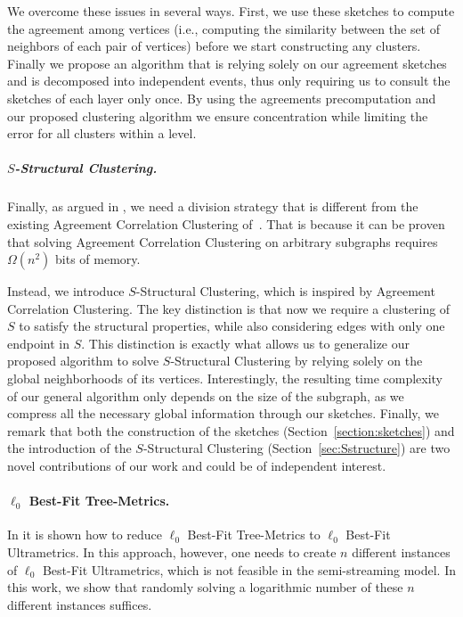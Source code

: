 \documentclass{article}
\begin{document}
We overcome these issues in several ways. 
First, we use these sketches to compute the agreement among vertices (i.e., computing the similarity between the set of neighbors of each pair of vertices) before we start constructing any clusters.
Finally we propose an algorithm that is relying solely on our agreement sketches and is decomposed into independent events, thus only requiring us to consult the sketches of each layer only once. By using the agreements precomputation and our proposed clustering algorithm we ensure concentration while limiting the error for all clusters within a level.


\subparagraph*{$S$-Structural Clustering.} Finally, as argued in , we need a division strategy that is different from the existing Agreement Correlation Clustering of~\cite{cohen2022fitting}.
That is because it can be proven that solving Agreement Correlation Clustering on arbitrary subgraphs requires $\Omega(n^2)$ bits of memory.

Instead, we introduce $S$-Structural Clustering, which is inspired by Agreement Correlation Clustering. The key distinction is that now we require a clustering of $S$ to satisfy the structural properties, while also considering edges with only one endpoint in $S$.
This distinction is exactly what allows us to generalize our proposed algorithm to solve $S$-Structural Clustering by relying solely on the global neighborhoods of its vertices. 
Interestingly, the resulting time complexity of our general algorithm only depends on the size of the subgraph, as we compress all the necessary global information through our sketches.
Finally, we remark that both the construction of the sketches (Section~\ref{section:sketches}) and the introduction of the \( S \)-Structural Clustering (Section~\ref{sec:Sstructure}) are two novel contributions of our work and could be of independent interest. 


\paragraph*{$\ell_0$ Best-Fit Tree-Metrics.}
In \cite{kipouridis2023fitting} it is shown how to reduce $\ell_0$ Best-Fit Tree-Metrics to $\ell_0$ Best-Fit Ultrametrics.
In this approach, however, one needs to create $n$ different instances of $\ell_0$ Best-Fit Ultrametrics, which is not feasible in the semi-streaming model.
In this work, we show that randomly solving a logarithmic number of these $n$ different instances suffices.
\end{document}
